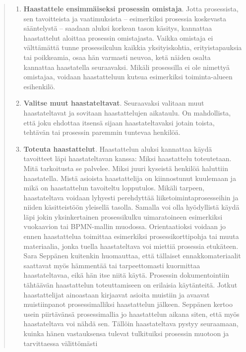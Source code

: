 \documentclass[
  finnish,
  letterpaper,
  DIV=11,
  numbers=noendperiod,
  oneside]{scrreprt}
\begin{document}
\begin{quote}
\begin{enumerate}
  taustatietojen perusteella prosessikulusta ensimmäinen luonnos. Mikäli
  prosessia on tarkoitus mallintaa myös haastattelun aikana (ks. kohta
  6), voi alustava hahmotelma toimia haastattelijan muistin tukena.
\item
  \textbf{Haastattele ensimmäiseksi prosessin omistaja}. Jotta
  prosessista, sen tavoitteista ja vaatimuksista -- esimerkiksi
  prosessia koskevasta sääntelystä -- saadaan aluksi korkean tason
  käsitys, kannattaa haastattelut aloittaa prosessin omistajasta. Vaikka
  omistaja ei välttämättä tunne prosessikulun kaikkia yksityiskohtia,
  erityistapauksia tai poikkeamia, osaa hän varmasti neuvoa, ketä näiden
  osalta kannattaa haastatella seuraavaksi. Mikäli prosessilla ei ole
  nimettyä omistajaa, voidaan haastatteluun kutsua esimerkiksi
  toiminta-alueen esihenkilö.
\item
  \textbf{Valitse muut haastateltavat}. Seuraavaksi valitaan muut
  haastateltavat ja sovitaan haastattelujen aikataulu. On mahdollista,
  että joku ehdottaa itsensä sijaan haastateltavaksi jotain toista,
  tehtävän tai prosessin paremmin tuntevaa henkilöä.
\item
  \textbf{Toteuta haastattelut}. Haastattelun aluksi kannattaa käydä
  tavoitteet läpi haastateltavan kanssa: Miksi haastattelu toteutetaan.
  Mitä tarkoitusta se palvelee. Miksi juuri kyseistä henkilöä haluttiin
  haastatella. Mistä asioista haastattelija on kiinnostunut kuulemaan ja
  mikä on haastattelun tavoiteltu lopputulos. Mikäli tarpeen,
  haastateltava voidaan lyhyesti perehdyttää liiketoimintaprosesseihin
  ja niiden käsitteistöön yleisellä tasolla. Samalla voi olla
  hyödyllistä käydä läpi jokin yksinkertainen prosessikulku
  uimaratoineen esimerkiksi vuokaavion tai BPMN-mallin muodossa.
  Orientaatioksi voidaan jo ennen haastattelua toimittaa esimerkiksi
  prosessikorttipohja tai muuta materiaalia, jonka tuella haastateltava
  voi miettiä prosessia etukäteen. Sara Seppänen kuitenkin huomauttaa,
  että tällaiset ennakkomateriaalit saattavat myös hämmentää tai
  tarpeettomasti kuormittaa haastateltavaa, eikä hän itse niitä käytä.
  Prosessin dokumentointiin tähtäävän haastattelun toteuttamiseen on
  erilaisia käytänteitä. Jotkut haastattelijat ainoastaan kirjaavat
  asioita muistiin ja avaavat muistiinpanot prosessimalliksi
  haastattelun jälkeen. Seppänen kertoo usein piirtävänsä prosessimallia
  jo haastattelun aikana siten, että myös haastateltava voi nähdä sen.
  Tällöin haastateltava pystyy seuraamaan, kuinka hänen vastauksensa
  tulevat tulkituiksi prosessin muotoon ja tarvittaessa välittömästi

\end{enumerate}
\end{quote}
\end{document}
